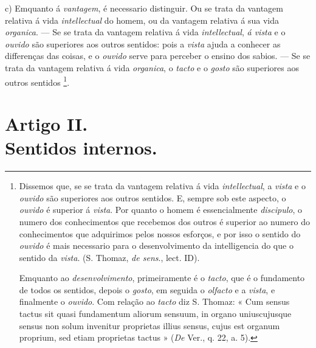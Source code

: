 




c) Emquanto á \emph{vantagem}, é necessario distinguir. Ou se trata da vantagem relativa á vida \emph{intellectual} do homem, ou da vantagem relativa á sua vida \emph{organica}. --- Se se trata da vantagem relativa á vida \emph{intellectual}, \emph{á vista} e o \emph{ouvido} são superiores aos outros sentidos: pois a \emph{vista} ajuda a conhecer as differenças das coisas, e o \emph{ouvido} serve para perceber o    ensino dos sabios. --- Se se trata da vantagem relativa á vida \emph{organica}, o \emph{tacto} e o \emph{gosto} são superiores aos outros sentidos \footnote{Dissemos que, se se trata da vantagem relativa á vida \emph{intellectual}, a \emph{vista} e o \emph{ouvido} são superiores aos outros sentidos. E, sempre sob este aspecto, o \emph{ouvido} é superior á \emph{vista}. Por quanto o homem é essencialmente \emph{discipulo}, o numero dos conhecimentos que recebemos dos outros é superior ao numero do conhecimentos que adquirimos pelos nossos esforços, e por isso o sentido do \emph{ouvido} é mais necessario para o desenvolvimento da intelligencia do que o sentido da \emph{vista}. (S. Thomaz, \emph{de sens}., lect. ID).\par Emquanto ao \emph{desenvolvimento}, primeiramente é o \emph{tacto}, que é o fundamento de todos os sentidos, depois o \emph{gosto}, em seguida o \emph{olfacto} e a \emph{vista}, e finalmente o \emph{ouvido}. Com relação ao \emph{tacto} diz S. Thomaz: « Cum sensus tactus sit quasi fundamentum aliorum sensuum, in organo uniuscujusque sensus non solum invenitur proprietas illius sensus, cujus est organum proprium, sed etiam proprietas tactus » (\emph{De} Ver., q. 22, a. 5).}. \textbar{}


\section*{Artigo II.\\ Sentidos internos.}


